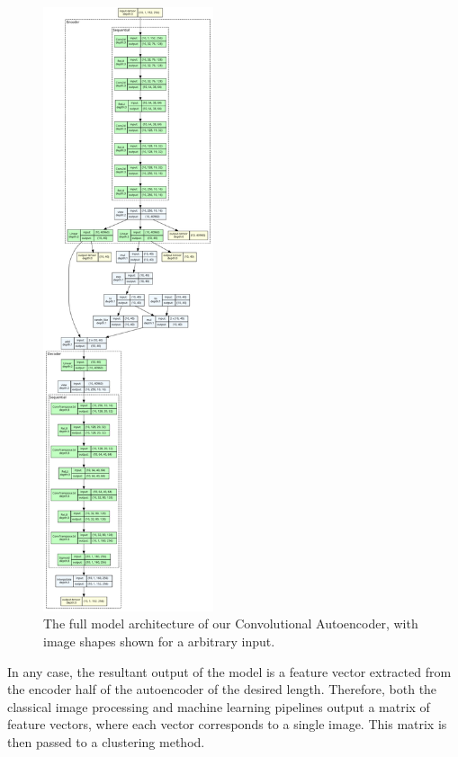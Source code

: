 \documentclass[conference]{IEEEtran}
\begin{document}
\begin{figure}[h]
    \includegraphics[width=5cm]{modelpic.png}
    \centering
    \caption{The full model architecture of our Convolutional Autoencoder, with image shapes shown for a arbitrary input.}
\label{fig:CAE}
\end{figure}

In any case, the resultant output of the model is a feature vector extracted from the encoder half of the autoencoder of the desired length. 
Therefore, both the classical image processing and machine learning pipelines output a matrix of feature vectors, where each vector corresponds to a single image. 
This matrix is then passed to a clustering method. 
\end{document}
